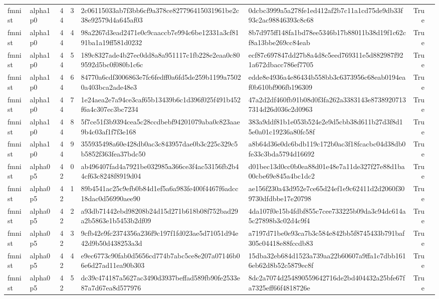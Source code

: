 \begin{tabular}{llrrllrl}
fmnist & alpha1p0 & 44 & 3 & 2c06115033ab7f3bb6cf9a378ce827796415031961be2c38e92579d4a645af03 & 0dcbc3999a5a278fe1ed412af2b7c11a1cd75de9db33f93c2ac98846393c8c68 & True &  \\
fmnist & alpha1p0 & 44 & 4 & 98a2267d3ead2471e0c9caaccb7e994c6be12331a3cf8191ba1a19ff581d0232 & 8b7d975ff148fa1bd78ee5346b17b88011b38d19f1c62cf8a13bbe269cc84eab & True &  \\
fmnist & alpha1p0 & 44 & 5 & 189c8327ade4b27ec0dd8a8a951117c1fb228e2eaa0c809592d5bc0f080b1c6c & ecf87c697847dd27b8a4d8c5eed769311e5d882987f921a672dbacc786ef7705 & True &  \\
fmnist & alpha1p0 & 44 & 6 & 84770a6cdf3006863e7fc6fedff0a6fd5de259b1199a75020a403bca2ade48e3 & edde8e4936a4e86434b558bb3c6373956c68eab0194eaf0b610bf906fb196309 & True &  \\
fmnist & alpha1p0 & 44 & 7 & 1e24aea2e7a94ce3caf65b13439b6c1d396f025f491b452f6a4c307ec3bc7234 & 47a2d2df460fb91b08d0f3fa262a3383143e87389207137314d26d036c2d0963 & True &  \\
fmnist & alpha1p0 & 44 & 8 & 5f7ce51f3b9394cea5c28ccdbebf94201079aba0c823aae9b4c03af1f7f3e168 & 383a9ddf81b1e053b524e2e9d5cbb38d611b27d3f8d15e0a01c19236a80fc58f & True &  \\
fmnist & alpha1p0 & 44 & 9 & 355935498a60e428db0ac3c843957dae0b3c225c329c5b5852f363fea37bdc50 & a8b64d36e0dc6bdb119c172b0ac3f18fcacbc04d38db0fe33c3bda5794d16692 & True &  \\
fmnist & alpha0p5 & 42 & 0 & ab496407fad4a7921be032985a366ce3f4ac53156fb2b44cf63c8248f8919d04 & d01bec13d0cc0b0ea88d01e48e7a11de327f27e88d1ba00cbe69e845a4bc1dc2 & True &  \\
fmnist & alpha0p5 & 42 & 1 & 89b4541ac25c9efb0b84d1ef5a6a983fe400f4467f6adcc18dac0d56990aee90 & ae156f230a43d952e7ce65d24ef1e9c62411d2d2060f309730dfdbbe17e20798 & True &  \\
fmnist & alpha0p5 & 42 & 2 & a93db71442ebd98208b24d15d271b618b08f752bad29a2b5863e1b5453b2df09 & 4da107f0e15b4fdbf855c7cee733225b09da3c94dc614a5c27898b3c02d4c9f4 & True &  \\
fmnist & alpha0p5 & 42 & 3 & 9cfb42e9fc2374356a236f9c197f1fd023ae5d71051d94e42d9b50d438253a3d & a7197d71be0e93ca7b3c584e842bb5f8745433b791baf305c04418e88fccdb83 & True &  \\
fmnist & alpha0p5 & 42 & 4 & e9ec6773c90fab0d5656cd774b7abc5ce8e207a07146b06e6d27ad11ea90b303 & 15dba32eb684d1523a739aa22b60607a9ffa1c7dbb1616eb62d8b52c5879ec8f & True &  \\
fmnist & alpha0p5 & 42 & 5 & dc39c474187a5627ac3490d3937beffad589fb90fe2533e87a7d67ea8d577976 & 8dc2a7074d254890559642716de2bd404432a25bfe67fa7325eff66f4818726e & True &  \\

\end{tabular}
